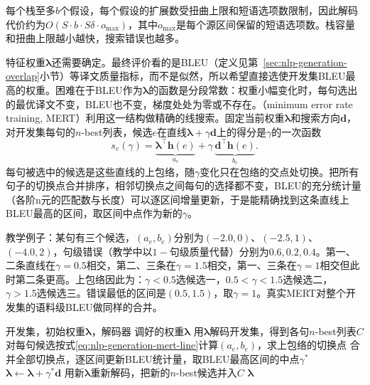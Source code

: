 每个栈至多$b$个假设，每个假设的扩展数受扭曲上限和短语选项数限制，因此解码代价约为$O(S\cdot b\cdot S\delta\cdot o_{\max})$，其中$o_{\max}$是每个源区间保留的短语选项数。栈容量和扭曲上限越小越快，搜索错误也越多。

特征权重$\bm\lambda$还需要确定。最终评价看的是BLEU（定义见第~\ref{sec:nlp-generation-overlap}小节）等译文质量指标，而不是似然，所以希望直接选使开发集BLEU最高的权重。困难在于BLEU作为$\bm\lambda$的函数是分段常数：权重小幅变化时，每句选出的最优译文不变，BLEU也不变，梯度处处为零或不存在。（minimum error rate training, MERT）利用这一结构做精确的线搜索。固定当前权重$\bm\lambda$和搜索方向$\bm d$，对开发集每句的$n$-best列表，候选$e$在直线$\bm\lambda+\gamma\bm d$上的得分是$\gamma$的一次函数
\begin{equation}
  s_e(\gamma)=\underbrace{\bm\lambda^{\top}\bm h(e)}_{a_e}+\gamma\,\underbrace{\bm d^{\top}\bm h(e)}_{b_e}.
  \label{eq:nlp-generation-mert-line}
\end{equation}
每句被选中的候选是这些直线的上包络，随$\gamma$变化只在包络的交点处切换。把所有句子的切换点合并排序，相邻切换点之间每句的选择都不变，BLEU的充分统计量（各阶n元的匹配数与长度）可以逐区间增量更新，于是能精确找到这条直线上BLEU最高的区间，取区间中点作为新的$\gamma$。

教学例子：某句有三个候选，$(a_e,b_e)$分别为$(-2.0,0)$、$(-2.5,1)$、$(-4.0,2)$，句级错误（教学中以$1-$句级质量代替）分别为$0.6,0.2,0.4$。第一、二条直线在$\gamma=0.5$相交，第二、三条在$\gamma=1.5$相交，第一、三条在$\gamma=1$相交但此时第二条更高。上包络因此为：$\gamma<0.5$选候选一，$0.5<\gamma<1.5$选候选二，$\gamma>1.5$选候选三。错误最低的区间是$(0.5,1.5)$，取$\gamma=1$。真实MERT对整个开发集的语料级BLEU做同样的合并。

\begin{algorithm}[最小错误率训练]
  \label{alg:nlp-generation-mert}
  \begin{algorithmic}[1]
    \Require 开发集，初始权重$\bm\lambda$，解码器
    \Ensure 调好的权重$\bm\lambda$
    \State 用$\bm\lambda$解码开发集，得到各句$n$-best列表$C$
    \Repeat
        \State 对每句候选按式\eqref{eq:nlp-generation-mert-line}计算$(a_e,b_e)$，求上包络的切换点
        \State 合并全部切换点，逐区间更新BLEU统计量，取BLEU最高区间的中点$\gamma^\ast$
        \State $\bm\lambda\gets\bm\lambda+\gamma^\ast\bm d$
      \EndFor
      \State 用新$\bm\lambda$重新解码，把新的$n$-best候选并入$C$
    \State \Return $\bm\lambda$
  \end{algorithmic}
\end{algorithm}

